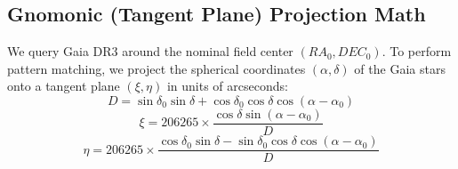 \documentclass[11pt,a4paper]{article}
\begin{document}
\subsection{Gnomonic (Tangent Plane) Projection Math}
We query Gaia DR3 around the nominal field center $(RA_0, DEC_0)$. To perform pattern matching, we project the spherical coordinates $(\alpha, \delta)$ of the Gaia stars onto a tangent plane $(\xi, \eta)$ in units of arcseconds:
\begin{equation}
D = \sin\delta_0 \sin\delta + \cos\delta_0 \cos\delta \cos(\alpha - \alpha_0)
\end{equation}
\begin{equation}
\xi = 206265 \times \frac{\cos\delta \sin(\alpha - \alpha_0)}{D}
\end{equation}
\begin{equation}
\eta = 206265 \times \frac{\cos\delta_0 \sin\delta - \sin\delta_0 \cos\delta \cos(\alpha - \alpha_0)}{D}
\end{equation}
\end{document}
